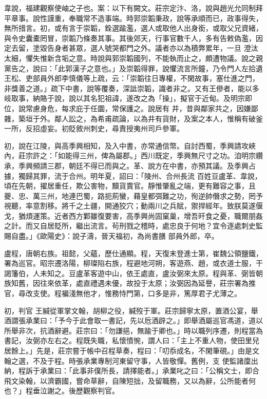 \begin{pinyinscope}
 韋說，福建觀察使岫之子也。案：以下有闕文。莊宗定汴、洛，說與趙光允同制拜平章事。說性謹重，奉職常不造事端。時郭崇韜秉政，說等承順而已，政事得失，無所措言。初，或有言于崇韜，銓選踰濫，選人或取他人出身銜，或取父兄資緒，與令史囊橐罔冒，崇韜乃條奏其事。其後郊天，行事官數千人，多有告敕偽濫，因定去留，塗毀告身者甚眾，選人號哭都門之外。議者亦以為積弊累年，一旦
 澄汰太細，懼失惟新含垢之意。時說與郭崇韜國列，不能執而止之，頗遭物議。說之親黨告之，說曰：「此郭漢子之意也。」及崇韜得罪，說懼流言所鐘，乃令門人左拾遺王松、吏部員外郎李慎儀等上疏，云：「崇韜往日專權，不閑故事，塞仕進之門，非獎善之道。」疏下中書，說等覆奏，深詆崇韜，識者非之。又有王傪者，能以多岐取事，納賂于說，說以其名犯祖諱，遂改之為「操」，擬官于近甸。及明宗即位，說常慮身危，每求庇于任圜，常保護之。說居有
 井，昔與鄰家共之，因嫌鄙雜，築垣于外。鄰人訟之，為希甫疏論，以為井有貨財，及案之本人，惟稱有破釜一所，反招虛妄。初貶敘州刺史，尋責授夷州司戶參軍。



 初，說在江陵，與高季興相知，及入中書，亦常通信幣。自討西蜀，季興請攻峽內，莊宗許之：「如能得三州，俾為屬郡。」西川既定，季興無尺寸之功。洎明宗纘承，季興頻請三郡，朝廷不得已而與之。革、說方在中書，亦預其議。及季興占據，獨歸其罪，流于合州。明年夏，詔曰：「陵州、合州長流
 百姓豆盧革、韋說，頃在先朝，擢居重任，欺公害物，黷貨賣官。靜惟肇亂之端，更有難容之事，且夔、忠、萬三州，地連巴蜀，路扼荊蠻，藉皇都弭難之功，徇逆帥僭求之勢，罔予視聽，率意割移。將千之土疆，開通狡穴；動兩川之兵賦，禦捍經年。致朕莫遂偃戈，猶煩運策。近者西方鄴雖復要害，高季興尚固窠巢，增吾旰食之憂，職爾朋姦之計。而又自居貶所，繼出流言。茍刑戮之稽時，處忠良于何地？宜令逐處刺史監賜自盡。」《歐陽史》：說子濤，晉天福初，為尚書膳
 部員外郎，卒。



 盧程，唐朝右族。祖懿，父蘊，歷仕通顯。程，天復末登進士第，崔魏公領鹽鐵，署為巡官。昭宗遷洛陽，柳璨陷右族，程避地河朔，客遊燕、趙，或衣道士服，干謁籓伯，人未知之。豆盧革客遊中山，依王處直，盧汝弼來太原。程與革、弼皆朝族知舊，因往來依革，處直禮遇未優，故投于太原；汝弼因為延譽，莊宗署為推官，尋改支使。程褊淺無他才，惟務恃門第，口多是非，篤厚君子尤薄之。



 初，判官
 王緘從軍掌文翰，胡柳之役，緘歿于軍。莊宗歸寧太原，置酒公宴，舉酒謂張承業曰：「予今于此會取一書記，先以卮酒辟之。」即舉酒屬巡官馮道，道以所舉非次，抗酒辭避。莊宗曰：「勿謙挹，無踰于卿也。」時以職列序遷，則程當為書記，汝弼亦左右之。程既失職，私懷憤惋，謂人曰：「主上不重人物，使田里兒居餘上。」先是，莊宗嘗于帳中召程草奏，程曰：「叨忝成名，不閑筆硯。」由是文翰之選，不及于程。時張承業專制河東留守事，人皆敬憚。舊例，支
 使監諸廩出納，程訴于承業曰：「此事非僕所長，請擇能者。」承業叱之曰：「公稱文士，即合飛文染翰，以濟霸國，嘗命草辭，自陳短拙，及留職務，又以為辭，公所能者何也？」程垂泣謝之。後歷觀察判官。




\end{pinyinscope}
